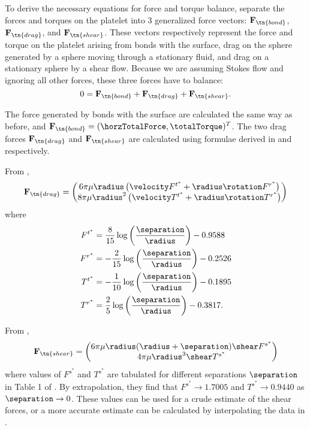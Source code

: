 To derive the necessary equations for force and torque balance,
separate the forces and torques on the platelet into 3 generalized
force vectors: $\mathbf{F}_\tn{bond}$, $\mathbf{F}_\tn{drag}$, and
$\mathbf{F}_\tn{shear}$. These vectors respectively represent the
force and torque on the platelet arising from bonds with the surface,
drag on the sphere generated by a sphere moving through a stationary
fluid, and drag on a stationary sphere by a shear flow. Because we are
assuming Stokes flow and ignoring all other forces, these three forces
have to balance:
\begin{equation}
  \label{eq:new-force-bal}
  0 = \mathbf{F}_\tn{bond} + \mathbf{F}_\tn{drag} + \mathbf{F}_\tn{shear}.
\end{equation}

The force generated by bonds with the surface are calculated the same
way as before, and
$\mathbf{F}_\tn{bond} = (\horzTotalForce, \totalTorque)^T$. The two
drag forces $\mathbf{F}_\tn{drag}$ and $\mathbf{F}_\tn{shear}$ are
calculated using formulae derived in \cite{Goldman1967a} and
\cite{Goldman1967b} respectively.

From \cite{Goldman1967a},
\begin{equation}
  \label{eq:goldman-dforce}
  \mathbf{F}_\tn{drag} =
  \begin{pmatrix}
    6\pi\mu\radius \left(\velocity F^{t^*} + \radius\rotation F^{r^*}
    \right) \\
    8\pi\mu\radius^2 \left(\velocity T^{t^*} + \radius\rotation
      T^{r^*} \right)
  \end{pmatrix}
\end{equation}
where
\begin{align}
  F^{t^*} &= \frac{8}{15} \log\left( \frac{\separation}{\radius}
            \right) - 0.9588 \\
  F^{r^*} &= -\frac{2}{15} \log\left( \frac{\separation}{\radius}
            \right) - 0.2526 \\
  T^{t^*} &= -\frac{1}{10} \log\left( \frac{\separation}{\radius}
            \right) - 0.1895 \\
  T^{r^*} &= \frac{2}{5} \log\left( \frac{\separation}{\radius}
            \right) - 0.3817.
\end{align}

From \cite{Goldman1967b},
\begin{equation}
  \label{eq:goldman-sforce}
  \mathbf{F}_\tn{shear} =
  \begin{pmatrix}
    6\pi\mu\radius(\radius + \separation)\shear F^{s^*} \\
    4\pi\mu\radius^3 \shear T^{s^*}
  \end{pmatrix}
\end{equation}
where values of $F^{s^*}$ and $T^{s^*}$ are tabulated for different
separations $\separation$ in Table 1 of \cite{Goldman1967b}. By
extrapolation, they find that $F^{s^*} \rightarrow 1.7005$ and
$T^{s^*} \rightarrow 0.9440$ as $\separation \rightarrow 0$. These
values can be used for a crude estimate of the shear forces, or a more
accurate estimate can be calculated by interpolating the data in
\cite{Goldman1967b}.

